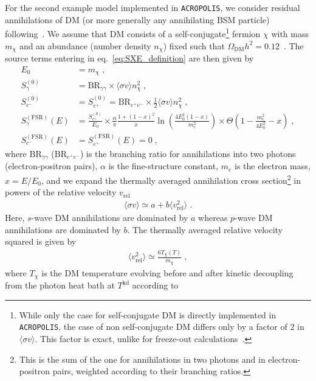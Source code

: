 \documentclass[11pt,a4paper]{article}
\newcommand{\eqsp}{\;}
\begin{document}
For the second example model implemented in \texttt{ACROPOLIS}, we consider residual annihilations of DM (or more generally any annihilating BSM particle) following~\cite{Depta:2019lbe}. We assume that DM consists of a self-conjugate\footnote{While only the case for self-conjugate DM is directly implemented in \texttt{ACROPOLIS}, the case of non self-conjugate DM differs only by a factor of 2 in $\langle \sigma v \rangle$. This factor is exact, unlike for freeze-out calculations~\cite{Bringmann:2020mgx}.} fermion $\chi$ with mass $m_\chi$ and an abundance (number density $n_\chi$) fixed such that $\Omega_\mathrm{DM} h^2 = 0.12$~\cite{Aghanim:2018eyx}.
The source terms entering in eq.~\eqref{eq:SXE_definition} are then given by~\cite{Depta:2019lbe}
\begin{align}
E_0 &= m_\chi \eqsp, \\
S_\gamma^{(0)} &= \text{BR}_{\gamma \gamma} \times \langle \sigma v \rangle n_\chi^2\eqsp, \\
S_{e^-}^{(0)} &= S_{e^+}^{(0)} = \text{BR}_{e^+ e^-} \times \frac{1}{2} \langle \sigma v \rangle n_\chi^2 \eqsp, \\
S_\gamma^{(\text{FSR})} (E) &=  \frac{S^{(0)}_{e^\pm}}{E_0} \times \frac{\alpha}{\pi} \frac{1 + (1-x)^2}{x} \ln \left( \frac{4 E_0^2 (1-x)}{m_e^2} \right) \times \Theta \left( 1 - \frac{m_e^2}{4 E_0^2} - x \right)\eqsp, \\
S_{e^-}^{(\text{FSR})} (E) &= S_{e^+}^{(\text{FSR})} (E) = 0\eqsp,
\end{align}
where $\text{BR}_{\gamma \gamma}$ ($\text{BR}_{e^+ e^-}$) is the branching ratio for annihilations into two photons (electron-positron pairs), $\alpha$ is the fine-structure constant, $m_e$ is the electron mass, $x = E/E_0$, and we expand the thermally averaged annihilation cross section\footnote{This is the sum of the one for annihilations in two photons and in electron-positron pairs, weighted according to their branching ratios.} in powers of the relative velocity $v_\mathrm{rel}$
\begin{align}
\langle \sigma v \rangle \simeq a + b \langle v_\mathrm{rel}^2 \rangle\eqsp.
\end{align}
Here, $s$-wave DM annihilations are dominated by $a$ whereas $p$-wave DM annihilations are dominated by $b$. The thermally averaged relative velocity squared is given by
\begin{align}
\langle v_\mathrm{rel}^2 \rangle \simeq \frac{6 T_\chi (T)}{m_\chi}\eqsp,
\end{align}
where $T_\chi$ is the DM temperature evolving before and after kinetic decoupling from the photon heat bath at $T^\mathrm{kd}$ according to
\end{document}
